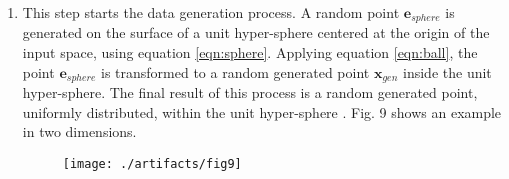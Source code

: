 \documentclass[parskip=full]{scrartcl}
\begin{document}
\begin{enumerate}
	\item This step starts the data generation process. A random point \(
	\textbf{e}_{sphere} \) is generated on the surface of a unit hyper-sphere
	centered at the origin of the input space, using equation
	\eqref{eqn:sphere}. Applying equation \eqref{eqn:ball}, the point \(
	\textbf{e}_{sphere} \) is transformed to a random generated point \(
	\textbf{x}_{gen} \) inside the unit hyper-sphere. The final result of this
	process is a random generated point, uniformly distributed, within the unit
	hyper-sphere \cite{DasGupta2011}. Fig. 9 shows an example in two dimensions.

	\begin{figure}[H]
		\centering
		\texttt{[image: ./artifacts/fig9]}
	\end{figure}


\end{enumerate}
\end{document}
